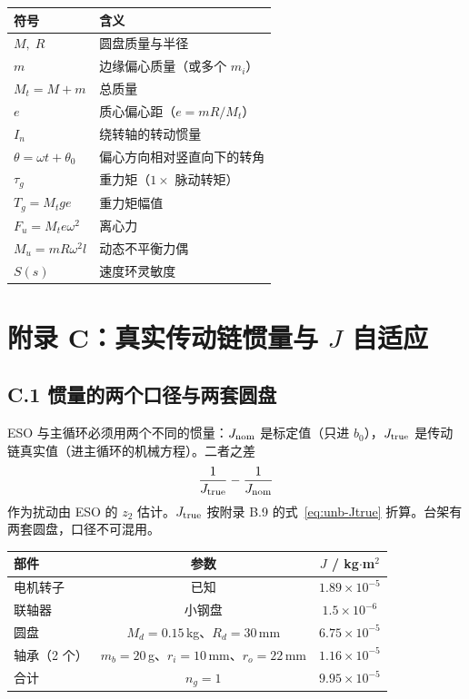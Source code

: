 \documentclass[11pt,a4paper]{article}
\theoremstyle{remark}\newtheorem{remark}{注}
\begin{document}
\begin{center}\footnotesize
\begin{tabular}{@{}ll@{}}
\toprule
符号 & 含义\\
\midrule
$M,\;R$ & 圆盘质量与半径\\
$m$ & 边缘偏心质量（或多个 $m_i$）\\
$M_t=M+m$ & 总质量\\
$e$ & 质心偏心距（$e=mR/M_t$）\\
$I_n$ & 绕转轴的转动惯量\\
$\theta=\omega t+\theta_0$ & 偏心方向相对竖直向下的转角\\
$\tau_g$ & 重力矩（$1\times$ 脉动转矩）\\
$T_g=M_t g e$ & 重力矩幅值\\
$F_u=M_t e\omega^2$ & 离心力\\
$M_u=mR\omega^2l$ & 动态不平衡力偶\\
$S(s)$ & 速度环灵敏度\\
\bottomrule
\end{tabular}
\end{center}


\section*{附录 C：真实传动链惯量与 $J$ 自适应}\label{app:jadapt}

\subsection*{C.1 惯量的两个口径与两套圆盘}

ESO 与主循环必须用两个不同的惯量：$J_{\rm nom}$ 是标定值（只进 $b_0$），$J_{\rm true}$ 是传动链真实值（进主循环的机械方程）。二者之差
\begin{equation}
\frac{1}{J_{\rm true}}-\frac{1}{J_{\rm nom}}
\end{equation}
作为扰动由 ESO 的 $z_2$ 估计。$J_{\rm true}$ 按附录 B.9 的式~\eqref{eq:unb-Jtrue} 折算。台架有两套圆盘，口径不可混用。

\begin{center}\footnotesize
\begin{tabular}{@{}lcc@{}}
\toprule
部件 & 参数 & $J$ / kg$\cdot$m$^2$\\
\midrule
电机转子 & 已知 & $1.89\times10^{-5}$\\
联轴器 & 小钢盘 & $1.5\times10^{-6}$\\
圆盘 & $M_d=0.15$\,kg、$R_d=30$\,mm & $6.75\times10^{-5}$\\
轴承（2 个） & $m_b=20$\,g、$r_i=10$\,mm、$r_o=22$\,mm & $1.16\times10^{-5}$\\
\midrule
合计 & $n_g=1$ & $9.95\times10^{-5}$\\
\bottomrule
\end{tabular}
\end{center}
\end{document}
